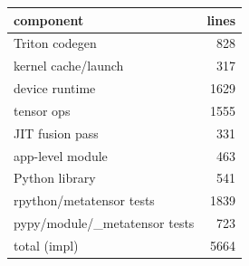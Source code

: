 \begin{tabular}{lr}
\toprule
component & lines \\
\midrule
Triton codegen & 828 \\
kernel cache/launch & 317 \\
device runtime & 1629 \\
tensor ops & 1555 \\
JIT fusion pass & 331 \\
app-level module & 463 \\
Python library & 541 \\
rpython/metatensor tests & 1839 \\
pypy/module/\_metatensor tests & 723 \\
total (impl) & 5664 \\
\bottomrule
\end{tabular}
